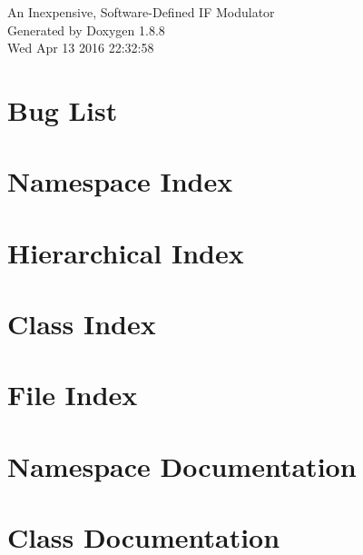\documentclass[twoside]{book}
\newcommand{\+}{\discretionary{\mbox{\scriptsize$\hookleftarrow$}}{}{}}
\newcommand{\clearemptydoublepage}{%
  \newpage{\pagestyle{empty}\cleardoublepage}%
}
\begin{document}
\hypersetup{pageanchor=false,
             bookmarks=true,
             bookmarksnumbered=true,
             pdfencoding=unicode
            }
\begin{titlepage}
\vspace*{7cm}
\begin{center}%
{\Large An Inexpensive, Software-\/\+Defined I\+F Modulator }\\
\vspace*{1cm}
{\large Generated by Doxygen 1.8.8}\\
\vspace*{0.5cm}
{\small Wed Apr 13 2016 22:32:58}\\
\end{center}
\end{titlepage}
\clearemptydoublepage
\tableofcontents
\clearemptydoublepage
{}
\hypersetup{pageanchor=true}

\chapter{Bug List}
\label{bug}
\hypertarget{bug}{}

\chapter{Namespace Index}

\chapter{Hierarchical Index}

\chapter{Class Index}

\chapter{File Index}

\chapter{Namespace Documentation}

\chapter{Class Documentation}





\end{document}
